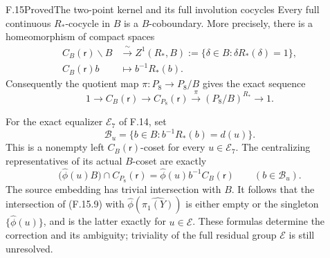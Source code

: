 \begin{claim}{F.15}{Proved}{The two-point kernel and its full involution cocycles}
Every full continuous $R_*$-cocycle in $B$ is a
$B$-coboundary.  More precisely, there is a homeomorphism
of compact spaces
\[
\begin{split}
 C_B(\mathsf r)\backslash B
    &\xrightarrow{\ \sim\ }
        Z^1(R_*,B):=\{\delta\in B:\delta R_*(\delta)=1\},\\
 C_B(\mathsf r)b&\longmapsto b^{-1}R_*(b).
\end{split}                                                     \tag{F.15.6}
\]
Consequently the quotient map $\pi:P_8\to P_8/B$ gives the
exact sequence
\[
 1\longrightarrow C_B(\mathsf r)
  \longrightarrow C_{P_8}(\mathsf r)
  \xrightarrow{\ \pi\ }(P_8/B)^{R_*}
  \longrightarrow1 .                                          \tag{F.15.7}
\]

For the exact equalizer $\mathcal E_7$ of F.14, set
\[
 \mathcal B_u=\{b\in B:b^{-1}R_*(b)=d(u)\}.
                                                               \tag{F.15.8}
\]
This is a nonempty left $C_B(\mathsf r)$-coset for every
$u\in\mathcal E_7$.  The centralizing representatives of
its actual $B$-coset are exactly
\[
 \bigl(\widehat\phi(u)B\bigr)\cap C_{P_8}(\mathsf r)
       =\widehat\phi(u)b^{-1}C_B(\mathsf r)
                 \qquad(b\in\mathcal B_u).                    \tag{F.15.9}
\]
The source embedding has trivial intersection with $B$.
It follows that the intersection of (F.15.9) with
$\widehat\phi(\widehat{\pi_1(Y)})$ is either empty or the
singleton $\{\widehat\phi(u)\}$, and is the latter
exactly for $u\in\mathcal E$.  These formulas determine
the correction and its ambiguity; triviality of the
full residual group $\mathcal E$ is still unresolved.
\end{claim}

